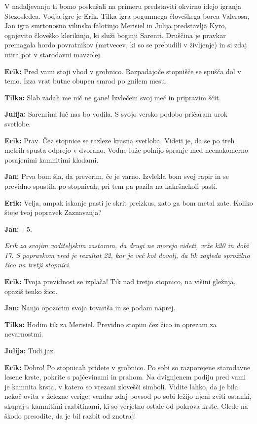 V nadaljevanju ti bomo poskušali na primeru predstaviti okvirno idejo igranja Stezosledca. Vodja igre je Erik. Tilka igra pogumnega človeškega borca Valerosa, Jan igra smrtonosno vilinsko falotinjo Merisiel in Julija predstavlja Kyro, ognjevito človeško klerikinjo, ki služi boginji Sarenri. Druščina je pravkar premagala hordo povratnikov (mrtvecev, ki so se prebudili v življenje) in si zdaj utira pot v starodavni mavzolej.

\vspace{20pt}

\textbf{Erik:} Pred vami stoji vhod v grobnico. Razpadajoče stopnišče se spušča dol v temo. Izza vrat butne obupen smrad po gnilem mesu.

\textbf{Tilka:} Slab zadah me nič ne gane! Izvlečem svoj meč in pripravim ščit.

\textbf{Julija:} Sarenrina luč nas bo vodila. S svojo versko podobo pričaram urok svetlobe.

\textbf{Erik:} Prav. Čez stopnice se razleze krasna svetloba. Videti je, da se po treh metrih spusta odprejo v dvorano. Vodne luže polnijo špranje med neenakomerno posajenimi kamnitimi kladami.

\textbf{Jan:} Prva bom šla, da preverim, če je varno. Izvlekla bom svoj rapir in se previdno spustila po stopnicah, pri tem pa pazila na kakršnekoli pasti.

\textbf{Erik:} Velja, ampak iskanje pasti je skrit preizkus, zato ga bom metal zate. Koliko šteje tvoj popravek Zaznavanja?

\textbf{Jan:} +5.

\vspace{20pt}

\textit{Erik za svojim voditeljskim zastorom, da drugi ne morejo videti, vrže k20 in dobi 17. S popravkom vred je rezultat 22, kar je več kot dovolj, da lik zagleda sprožilno žico na tretji stopnici.}

\vspace{20pt}

\textbf{Erik:} Tvoja previdnost se izplača! Tik nad tretjo stopnico, na višini gležnja, opaziš tenko žico.

\textbf{Jan:} Nanjo opozorim svoja tovariša in se podam naprej.

\textbf{Tilka:} Hodim tik za Merisiel. Previdno stopim čez žico in oprezam za nevarnostmi.

\textbf{Julija:} Tudi jaz.

\textbf{Erik:} Dobro! Po stopnicah pridete v grobnico. Po sobi so razporejene starodavne lesene krste, pokrite s pajčevinami in prahom. Na dvignjenem podiju pred vami je kamnita krsta, v katero so vrezani zlovešči simboli. Vidite lahko, da je bila nekoč ovita v železne verige, vendar zdaj povsod po sobi ležijo njeni zviti ostanki, skupaj s kamnitimi razbitinami, ki so verjetno ostale od pokrova krste. Glede na škodo presodite, da je bil razbit od znotraj!

